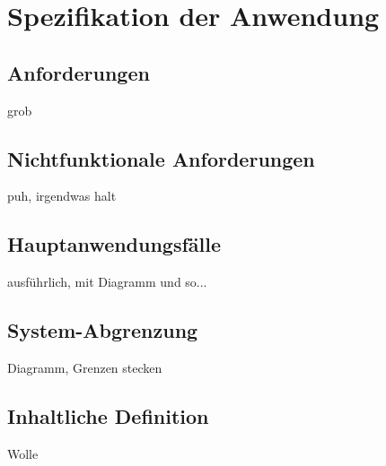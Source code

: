\section{Spezifikation der Anwendung}
\subsection{Anforderungen}
grob
\subsection{Nichtfunktionale Anforderungen}
puh, irgendwas halt
\subsection{Hauptanwendungsfälle}
ausführlich, mit Diagramm und so...
\subsection{System-Abgrenzung}
Diagramm, Grenzen stecken
\subsection{Inhaltliche Definition}
Wolle